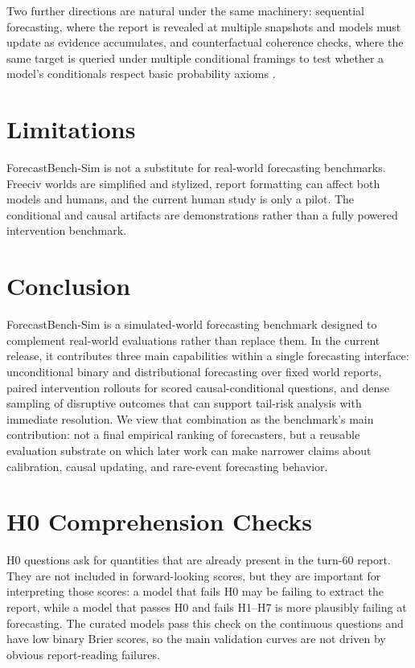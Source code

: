 \documentclass{article}
\begin{document}
Two further directions are natural under the same machinery: sequential forecasting, where the report is revealed at multiple snapshots and models must update as evidence accumulates, and counterfactual coherence checks, where the same target is queried under multiple conditional framings to test whether a model's conditionals respect basic probability axioms \citep{paleka2024consistency}.

\section{Limitations}

ForecastBench-Sim is not a substitute for real-world forecasting benchmarks. Freeciv worlds are simplified and stylized, report formatting can affect both models and humans, and the current human study is only a pilot. The conditional and causal artifacts are demonstrations rather than a fully powered intervention benchmark.

\section{Conclusion}

ForecastBench-Sim is a simulated-world forecasting benchmark designed to complement real-world evaluations rather than replace them. In the current release, it contributes three main capabilities within a single forecasting interface: unconditional binary and distributional forecasting over fixed world reports, paired intervention rollouts for scored causal-conditional questions, and dense sampling of disruptive outcomes that can support tail-risk analysis with immediate resolution. We view that combination as the benchmark's main contribution: not a final empirical ranking of forecasters, but a reusable evaluation substrate on which later work can make narrower claims about calibration, causal updating, and rare-event forecasting behavior.

\clearpage



\clearpage
\appendix
\onecolumn

\section{H0 Comprehension Checks}
\label{app:h0}

H0 questions ask for quantities that are already present in the turn-60 report. They are not included in forward-looking scores, but they are important for interpreting those scores: a model that fails H0 may be failing to extract the report, while a model that passes H0 and fails H1--H7 is more plausibly failing at forecasting. The curated models pass this check on the continuous questions and have low binary Brier scores, so the main validation curves are not driven by obvious report-reading failures.
\end{document}

